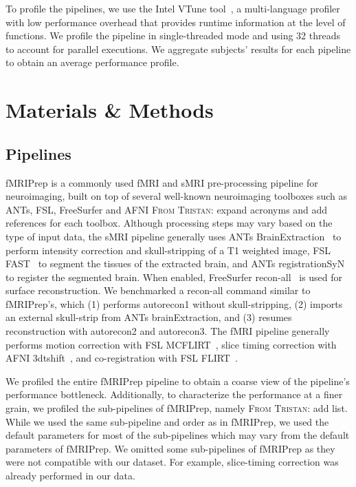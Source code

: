\documentclass[conference]{IEEEtran}
\newcommand{\TG}[1]{\color{blue}\textsc{From Tristan: }#1\color{black}}
\begin{document}
To profile the pipelines, we use the Intel VTune tool~\cite{vtune-profiler}, a multi-language profiler with low performance overhead that provides runtime information at the level of functions. We profile the pipeline in single-threaded mode and using 32 threads to account for parallel executions. We aggregate subjects' results for each pipeline to obtain an average performance profile. 

\section{Materials \& Methods}
\subsection{Pipelines}
fMRIPrep is a commonly used fMRI and sMRI pre-processing pipeline for neuroimaging, built on top of several well-known neuroimaging toolboxes such as ANTs, FSL, FreeSurfer and AFNI \TG{expand acronyms and add references for each toolbox}. Although processing steps may vary based on the type of input data, the sMRI pipeline generally uses ANTs BrainExtraction~\cite{Tustison2010-gg,Avants2008-ea} to perform intensity correction and skull-stripping of a T1 weighted image, FSL FAST~\cite{Zhang2001-hx} to segment the tissues of the extracted brain, and ANTs registrationSyN~\cite{Avants2008-ea} to register the segmented brain. When enabled, FreeSurfer recon-all~\cite{Dale1999-wu} is used for surface reconstruction. We benchmarked a recon-all command similar to  fMRIPrep's, which (1) performs autorecon1 without skull-stripping, (2) imports an external skull-strip from ANTs brainExtraction, and (3) resumes reconstruction with autorecon2 and autorecon3. The fMRI pipeline generally performs motion correction with FSL MCFLIRT~\cite{Jenkinson2002-od}, slice timing correction with AFNI 3dtshift~\cite{Cox1996-nk}, and co-registration with FSL FLIRT~\cite{Jenkinson2002-od,Jenkinson2001-eu,Greve2009-dw}.

We profiled the entire fMRIPrep pipeline to obtain a coarse view of the pipeline's performance bottleneck. Additionally, to characterize the performance at a finer grain, we profiled the sub-pipelines of fMRIPrep, namely \TG{add list}. While we used the same sub-pipeline and order as in fMRIPrep, we used the default parameters for most of the sub-pipelines which may vary from the default parameters of fMRIPrep. We omitted some sub-pipelines of fMRIPrep as they were not compatible with our dataset. For example, slice-timing correction was already performed in our data.
\end{document}
